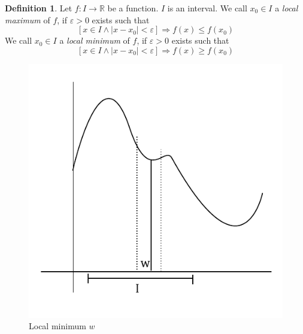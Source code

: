 \documentclass[a4paper,landscape,twocolumn]{article}
\theoremstyle{definition}
\newtheorem{defi}{Definition}
\newcommand\abs[1]{\left|#1\right|}
\begin{document}
\begin{defi}
  Let $f: I \to \mathbb R$ be a function. $I$ is an interval.
  We call $x_0 \in I$ a \emph{local maximum} of $f$, if $\varepsilon > 0$
  exists such that
  \[ [x \in I \land \abs{x - x_0} < \varepsilon] \Rightarrow f(x) \leq f(x_0) \]
  We call $x_0 \in I$ a \emph{local minimum} of $f$, if $\varepsilon > 0$
  exists such that
  \[ [x \in I \land \abs{x - x_0} < \varepsilon] \Rightarrow f(x) \geq f(x_0) \]
\end{defi}

\begin{figure}[!h]
  \begin{center}
    \includegraphics{img/local_minimum.pdf}
    \caption{Local minimum $w$}
    \label{img:local-minimum}
  \end{center}
\end{figure}

\end{document}
